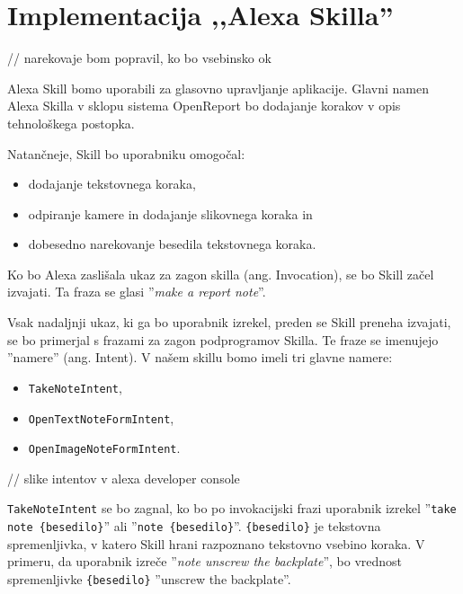 \documentclass[a4paper, 12pt]{book}
\begin{document}
% 
% 





\section{Implementacija ,,Alexa Skilla''}

// narekovaje bom popravil, ko bo vsebinsko ok

Alexa Skill bomo uporabili za glasovno upravljanje aplikacije.
Glavni namen Alexa Skilla v sklopu sistema OpenReport bo dodajanje korakov v opis tehnološkega postopka.

\noindent Natančneje, Skill bo uporabniku omogočal:
\begin{itemize}
	\item dodajanje tekstovnega koraka,
	\item odpiranje kamere in dodajanje slikovnega koraka in
	\item dobesedno narekovanje besedila tekstovnega koraka.
\end{itemize}

Ko bo Alexa zaslišala ukaz za zagon skilla (ang. Invocation), se bo Skill začel izvajati.
Ta fraza se glasi ''\textit{make a report note}''.

Vsak nadaljnji ukaz, ki ga bo uporabnik izrekel, preden se Skill preneha izvajati, se bo primerjal s frazami za zagon podprogramov Skilla.
Te fraze se imenujejo ''namere'' (ang. Intent).
V našem skillu bomo imeli tri glavne namere:

\begin{itemize}
	\item \texttt{TakeNoteIntent},
	\item \texttt{OpenTextNoteFormIntent},
	\item \texttt{OpenImageNoteFormIntent}.
\end{itemize}

// slike intentov v alexa developer console

\texttt{TakeNoteIntent} se bo zagnal, ko bo po invokacijski frazi uporabnik izrekel ''\texttt{take note \{besedilo\}}'' ali ''\texttt{note \{besedilo\}}''.
\texttt{\{besedilo\}} je tekstovna spremenljivka, v katero Skill hrani razpoznano tekstovno vsebino koraka.
V primeru, da uporabnik izreče ''\textit{note unscrew the backplate}'', bo vrednost spremenljivke \texttt{\{besedilo\}} ''unscrew the backplate''.
\end{document}
